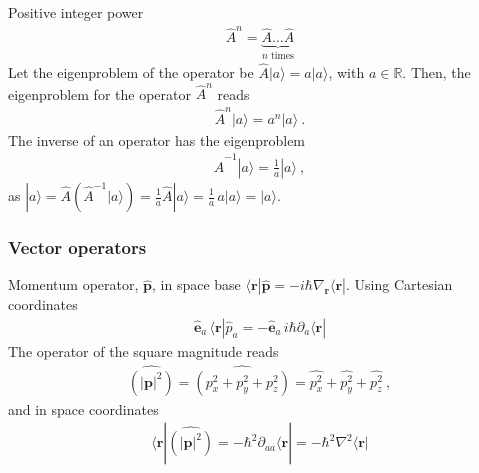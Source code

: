 \documentclass[letterpaper,10pt,english]{jupyterBook}
\begin{document}
\sphinxAtStartPar
Positive integer power
\begin{equation*}
\begin{split}\hat{A}^n = \underbrace{\hat{A} \dots \hat{A}}_{\text{$n$ times}}\end{split}
\end{equation*}
\sphinxAtStartPar
Let the eigenproblem of the operator be \(\hat{A} | a \rangle = a | a \rangle\), with \(a \in \mathbb{R}\). Then, the eigenproblem for the operator \(\hat{A}^n\) reads
\begin{equation*}
\begin{split}\hat{A}^n | a \rangle = a^n | a \rangle \ .\end{split}
\end{equation*}
\sphinxAtStartPar
The inverse of an operator has the eigenproblem
\begin{equation*}
\begin{split}\hat{A}^{-1} | a \rangle = \frac{1}{a} | a \rangle \ ,\end{split}
\end{equation*}
\sphinxAtStartPar
as \(| a \rangle = \hat{A} \left( \hat{A}^{-1} | a \rangle \right) = \frac{1}{a} \hat{A} | a \rangle = \frac{1}{a} \, a | a \rangle = | a \rangle\).
\subsubsection*{Vector operators}

\sphinxAtStartPar
Momentum operator, \(\hat{\mathbf{p}}\), in space base \(\langle \mathbf{r} | \hat{\mathbf{p}} = -i \hbar \nabla_{\mathbf{r}} \langle \mathbf{r} |\).
Using Cartesian coordinates
\begin{equation*}
\begin{split} \hat{\mathbf{e}}_a \, \langle \mathbf{r} | \hat{p}_a = - \hat{\mathbf{e}}_a \, i \hbar \partial_a \langle \mathbf{r} |\end{split}
\end{equation*}
\sphinxAtStartPar
The operator of the square magnitude reads
\begin{equation*}
\begin{split}\hat{\left( | \mathbf{p}|^2 \right)} = \hat{\left( p_x^2 + p_y^2 + p_z^2 \right)} = \hat{p_x^2} +  \hat{p_y^2} + \hat{p_z^2} \ , \end{split}
\end{equation*}
\sphinxAtStartPar
and in space coordinates
\begin{equation*}
\begin{split}\langle \mathbf{r} | \hat{\left( |\mathbf{p} |^2 \right)} = - \hbar^2 \partial_{aa} \langle \mathbf{r} | = - \hbar^2 \nabla^2 \langle \mathbf{r} | \end{split}
\end{equation*}
\sphinxstepscope
\end{document}
